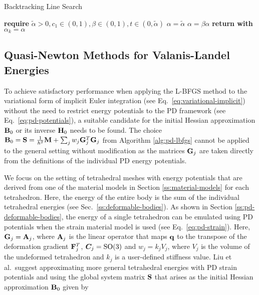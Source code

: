 \begin{algorithm}
\caption{Backtracking Line Search}\label{alg:backtracking}
\begin{algorithmic}[1]
\State \textbf{require } $\tilde{\alpha} > 0, c_1 \in (0, 1), \beta \in (0, 1), t \in (0, \tilde{\alpha})$
\State $\alpha = \tilde{\alpha}$
\State $\alpha = \beta \alpha$
\EndWhile
\State \textbf{return with } $\alpha_k = \alpha$
\EndProcedure
\end{algorithmic}
\end{algorithm}

\subsection{Quasi-Newton Methods for Valanis-Landel Energies}\label{ss:qn-valanis-landel}
To achieve satisfactory performance when applying the L-BFGS method to the variational form of implicit Euler integration 
(see Eq.\ \ref{eq:variational-implicit}) without the need to restrict energy potentials to the PD framework (see Eq.\ \ref{eq:pd-potentials}), a suitable
candidate for the initial Hessian approximation $\mathbf{B}_0$ or its inverse $\mathbf{H}_0$ needs to be found. The choice $\mathbf{B}_0 = 
\mathbf{S} = \frac{1}{h^2}\mathbf{M} + \sum_j w_j \mathbf{G}_j^T \mathbf{G}_j$ from Algorithm \ref{alg:pd-lbfgs} cannot be applied to the general setting 
without modification as the matrices $\mathbf{G}_j$ are taken directly from the definitions of the individual PD energy potentials.

We focus on the setting of tetrahedral meshes with energy potentials that are derived from one of the material models in Section \ref{ss:material-models} 
for each tetrahedron. Here, the energy of the entire body is the sum of the individual tetrahedral energies (see Sec.\ \ref{ss:deformable-bodies}).
As shown in Section \ref{ss:pd-deformable-bodies}, the energy of a single tetrahedron can be emulated using PD potentials when the strain material model is 
used (see Eq.\ \ref{eq:pd-strain}). Here, $\mathbf{G}_j = \mathbf{A}_j$, where $\mathbf{A}_j$ is the linear operator that maps $\mathbf{q}$ 
to the transpose of the deformation gradient $\mathbf{F}^T_j$, $\bm{C}_j = \text{SO}(3)$ and $w_j = k_jV_j$, where $V_j$ is the
volume of the undeformed tetrahedron and $k_j$ is a user-defined stiffness value. 
Liu et al.\ suggest approximating more general tetrahedral energies with PD strain potentials and using the global system
matrix $\mathbf{S}$ that arises as the initial Hessian approximation $\mathbf{B}_0$ given by

